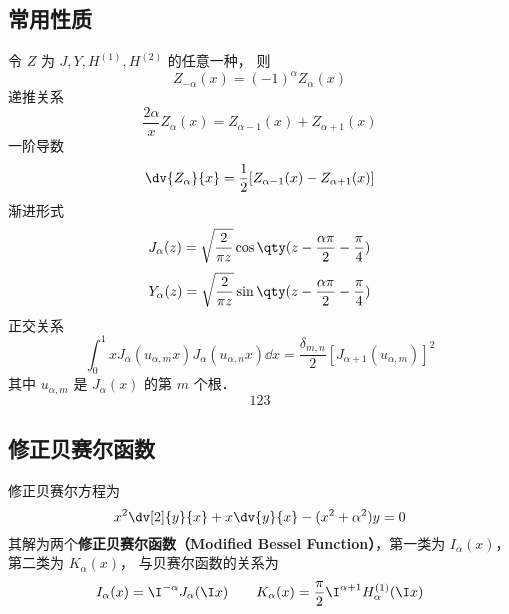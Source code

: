 \subsection{常用性质}
令 $Z$ 为 $J, Y, H^{(1)}, H^{(2)}$ 的任意一种， 则
\begin{equation}
Z_{-\alpha}(x) = (-1)^\alpha Z_\alpha(x)
\end{equation}
递推关系
\begin{equation}
\frac{2\alpha}{x} Z_\alpha(x) = Z_{\alpha -1}(x) + Z_{\alpha+1}(x)
\end{equation}
一阶导数
\begin{equation}
\dv{Z_\alpha}{x} = \frac12 [Z_{\alpha  - 1}(x) - Z_{\alpha +1}(x)]
\end{equation}
渐进形式
\begin{equation}
J_\alpha(z) = \sqrt{\frac{2}{\pi z}} \cos\qty(z - \frac{\alpha\pi}{2} - \frac{\pi}{4})
\end{equation}
\begin{equation}
Y_\alpha(z) = \sqrt{\frac{2}{\pi z}} \sin\qty(z - \frac{\alpha\pi}{2} - \frac{\pi}{4})
\end{equation}
正交关系
\begin{equation}
\int_0^1 x J_\alpha (u_{\alpha ,m} x) J_\alpha (u_{\alpha ,n} x) \dd{x} = \frac{\delta_{m,n}}{2}[J_{\alpha + 1} (u_{\alpha ,m})]^2
\end{equation}
其中 $u_{\alpha, m}$ 是 $J_\alpha(x)$ 的第 $m$ 个根．
\begin{equation}
123
\end{equation}

\subsection{修正贝赛尔函数}
修正贝赛尔方程为
\begin{equation}
x^2 \dv[2]{y}{x} + x \dv{y}{x} - (x^2 + \alpha ^2)y = 0
\end{equation}
其解为两个\textbf{修正贝赛尔函数（Modified Bessel Function）}，第一类为 $I_\alpha(x)$，  第二类为 $K_\alpha(x)$，  与贝赛尔函数的关系为
\begin{equation}
I_\alpha(x) = \I^{-\alpha} J_\alpha(\I x)
\qquad
K_\alpha(x) = \frac{\pi}{2} \I^{\alpha  + 1} H_\alpha ^{(1)}(\I x)
\end{equation}

